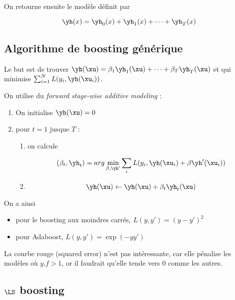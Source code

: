 	On retourne ensuite le modèle définit par
	
	$$\yh(x) = \yh_0(x) + \yh_1(x) + \dots + \yh_T(x)$$
	
	
	\subsection{Algorithme de boosting générique}
	
	Le but est de trouver $\yh(\xu) = \beta_1 \yh_1(\xu) + \dots + \beta_T \yh_T(\xu)$ et qui minimise $\sum_{i = 1}^N L(y_i, \yh(\xu_i))$.
	
	On utilise du \textit{forward stage-wise additive modeling} :
	
	\begin{enumerate}
		\item On initialise $\yh(\xu) = 0$
		\item pour $t = 1$ jusque $T$ :
		
		\begin{enumerate}
			\item on calcule
			
			$$(\beta_t, \yh_t) = arg \min_{\beta, \yh'} \sum_i L(y_i, \yh(\xu_i) + \beta \yh'(\xu_i))$$
			\item 
			
			$$\yh(\xu) \leftarrow \yh(\xu) + \beta_t \yh_t(\xu)$$
		\end{enumerate}
	\end{enumerate}
	
	On a ainsi
	
	\begin{itemize}
		\item pour le boosting aux moindres carrés, $L(y, y') = (y - y')^2$
		\item pour Adaboost, $L(y, y') = \exp{(-y y')}$
	\end{itemize}
	
	
	La courbe rouge (squared error) n'est pas intéressante, car elle pénalise les modèles où $y.f > 1$, or il faudrait qu'elle tende vers 0 comme les autres.
	
	\subsection{$\LS$ boosting}

		
